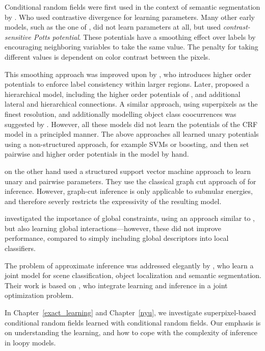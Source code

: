 

Conditional random fields were first used in the context of semantic
segmentation by \citet{he2004multiscale}.  Who used contrastive divergence for
learning parameters. Many other early models, such as the one of
\citet{shotton2006textonboost}, did not learn parameters at all, but used
\emph{contrast-sensitive Potts potential}. These potentials have a smoothing
effect over labels by encouraging neighboring variables to take the same value.
The penalty for taking different values is dependent on color contrast between
the pixels.

This smoothing approach was improved upon by \citet{kohli2009robust}, who
introduces higher order potentials to enforce label consistency within larger
regions. Later, \citet{ladicky2009associative} proposed a hierarchical model,
including the higher order potentials of \citet{kohli2009robust}, and
additional lateral and hierarchical connections. A similar approach, using
superpixels as the finest resolution, and additionally modelling object class
coocurrences was suggested by \citet{gonfaus2010harmony}.  However, all these
models did not learn the potentials of the CRF model in a principled manner.
The above approaches all learned unary potentials using a non-structured
approach, for example SVMs or boosting, and then set pairwise and higher order
potentials in the model by hand.

\citet{szummer2008learning} on the other hand used a structured support vector
machine approach to learn unary and pairwise parameters. They use the classical
graph cut approach of \citet{boykov2001fast} for inference.  However, graph-cut
inference is only applicable to submular energies, and therefore severly
restricts the expressivity of the resulting model.

\citet{lucchi2011spatial} investigated the importance of global constraints,
using an approach similar to \citet{szummer2008learning}, but also learning
global interactions---however, these did not improve performance, compared to
simply including global descriptors into local classifiers.

The problem of approximate inference was addressed elegantly by
\citet{yao2012describing}, who learn a joint model for scene classification,
object localization and semantic segmentation.  Their work is based on
\citet{hazan2010primal}, who integrate learning and inference in a joint
optimization problem.

In Chapter~\ref{exact_learning} and Chapter~\ref{nyu}, we investigate
superpixel-based conditional random fields learned with conditional random
fields. Our emphasis is on understanding the learning, and how to cope with the
complexity of inference in loopy models.
